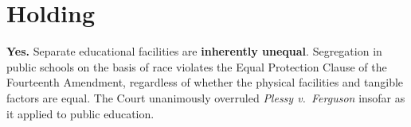 \section{Holding}

\begin{tcolorbox}[holdingbox]
  \textbf{Yes.}  Separate educational facilities are \textbf{inherently unequal}.
  Segregation in public schools on the basis of race violates the Equal Protection Clause
  of the Fourteenth Amendment, regardless of whether the physical facilities and tangible
  factors are equal.  The Court unanimously overruled \textit{Plessy v.\ Ferguson}
  insofar as it applied to public education.
\end{tcolorbox}

